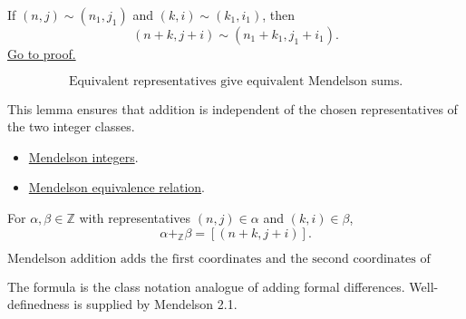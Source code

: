 \begin{lemma}
\label{lem:men-add-welld}
If \((n,j)\sim(n_1,j_1)\) and \((k,i)\sim(k_1,i_1)\), then
\[
  (n+k,j+i)\sim(n_1+k_1,j_1+i_1).
\]
\hyperref[prf:men-add-welld]{Go to proof.}
\end{lemma}


\begin{remark*}
\[
  \text{Equivalent representatives give equivalent Mendelson sums.}
\]
\end{remark*}

\begin{remark*}[Interpretation]
This lemma ensures that addition is independent of the chosen representatives
of the two integer classes.
\end{remark*}

\begin{dependencies}
\begin{itemize}
  \item \hyperref[def:men-integers]{Mendelson integers}.
  \item \hyperref[def:men-equivalence-relation]{Mendelson equivalence relation}.
\end{itemize}
\end{dependencies}

\begin{definition}
\label{def:men-addition}
For \(\alpha,\beta\in\mathbb{Z}\) with representatives
\((n,j)\in\alpha\) and \((k,i)\in\beta\),
\[
  \alpha+_{\mathbb{Z}}\beta=[(n+k,j+i)].
\]
\end{definition}


\begin{remark*}
\[
  \text{Mendelson addition adds the first coordinates and the second
  coordinates of representatives.}
\]
\end{remark*}

\begin{remark*}[Interpretation]
The formula is the class notation analogue of adding formal differences.
Well-definedness is supplied by Mendelson 2.1.
\end{remark*}


